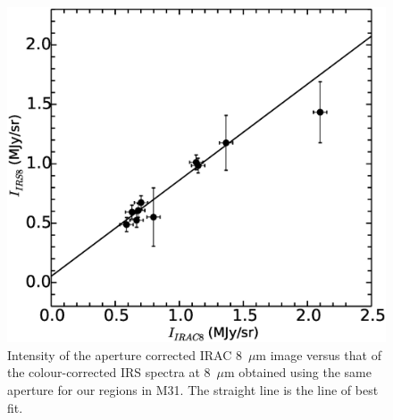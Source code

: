 \documentclass[useAMS,usenatbib,a4paper]{mn2e}
\begin{document}
\begin{figure}
\centering
\includegraphics[scale=0.25]{./fig4.eps}
\caption{Intensity of the aperture corrected IRAC 8~$\mu$m image versus that of the colour-corrected IRS spectra at 8~$\mu$m  
obtained using the same aperture for our regions in M31. The straight line is the line of best fit. }
\label{offset}
\end{figure}
\end{document}

